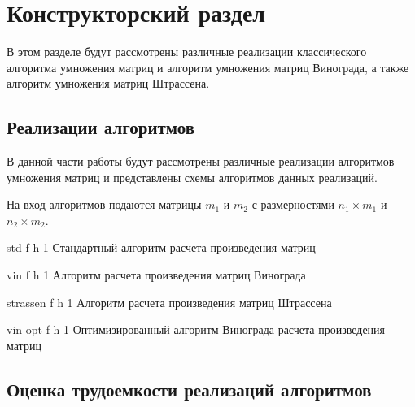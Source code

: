 \chapter{Конструкторский раздел}



В этом разделе будут рассмотрены различные реализации классического алгоритма умножения матриц и алгоритм умножения матриц
Винограда, а также алгоритм умножения матриц Штрассена.


\section{Реализации алгоритмов}

В данной части работы будут рассмотрены различные реализации алгоритмов
умножения матриц и представлены схемы алгоритмов данных реализаций.

На вход алгоритмов подаются матрицы $m_{1}$ и $m_{2}$ с размерностями $n_{1}\times m_{1}$ и $n_{2}\times m_{2}$.



{std} %
{f} %
{h} %
{1\textwidth} %
{Стандартный алгоритм расчета произведения матриц} %

{vin} %
{f} %
{h} %
{1\textwidth} %
{Алгоритм расчета произведения матриц Винограда} %

{strassen} %
{f} %
{h} %
{1\textwidth} %
{Алгоритм расчета произведения матриц Штрассена} %

{vin-opt} %
{f} %
{h} %
{1\textwidth} %
{Оптимизированный алгоритм Винограда расчета произведения матриц} %




\section{Оценка трудоемкости реализаций алгоритмов}

